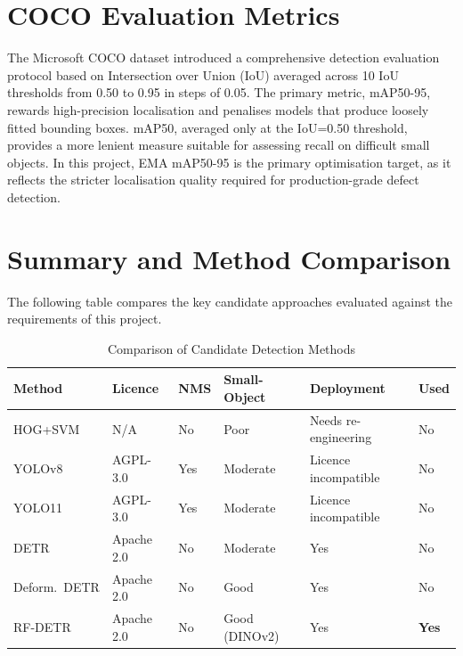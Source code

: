 \section{COCO Evaluation Metrics}

The Microsoft COCO dataset \cite{lin2014} introduced a comprehensive detection evaluation protocol based on Intersection over Union (IoU) averaged across 10 IoU thresholds from 0.50 to 0.95 in steps of 0.05. The primary metric, mAP50-95, rewards high-precision localisation and penalises models that produce loosely fitted bounding boxes. mAP50, averaged only at the IoU=0.50 threshold, provides a more lenient measure suitable for assessing recall on difficult small objects. In this project, EMA mAP50-95 is the primary optimisation target, as it reflects the stricter localisation quality required for production-grade defect detection.

\section{Summary and Method Comparison}

The following table compares the key candidate approaches evaluated against the requirements of this project.

\begin{table}[H]
\centering
\caption{Comparison of Candidate Detection Methods}
\begin{tabular}{l l l l l l}
\toprule
\rowcolor{tableHeader}
{\color{white}\bfseries Method} &
{\color{white}\bfseries Licence} &
{\color{white}\bfseries NMS} &
{\color{white}\bfseries Small-Object} &
{\color{white}\bfseries Deployment} &
{\color{white}\bfseries Used} \\
\midrule
HOG+SVM \cite{xu2020}          & N/A        & No  & Poor          & Needs re-engineering          & No \\
\rowcolor{tableRowAlt}
YOLOv8 \cite{jocher2022}       & AGPL-3.0   & Yes & Moderate      & \textcolor{magnaRed}{Licence incompatible}  & No \\
YOLO11 \cite{jocher2022}       & AGPL-3.0   & Yes & Moderate      & \textcolor{magnaRed}{Licence incompatible}  & No \\
\rowcolor{tableRowAlt}
DETR \cite{carion2020}         & Apache 2.0 & No  & Moderate      & Yes                           & No \\
Deform.\ DETR \cite{zhu2020}   & Apache 2.0 & No  & Good          & Yes                           & No \\
\rowcolor{tableRowAlt}
RF-DETR \cite{robinson2025}    & Apache 2.0 & No  & Good (DINOv2) & \textcolor{successGreen}{Yes} & \textbf{Yes} \\
\bottomrule
\end{tabular}
\end{table}


